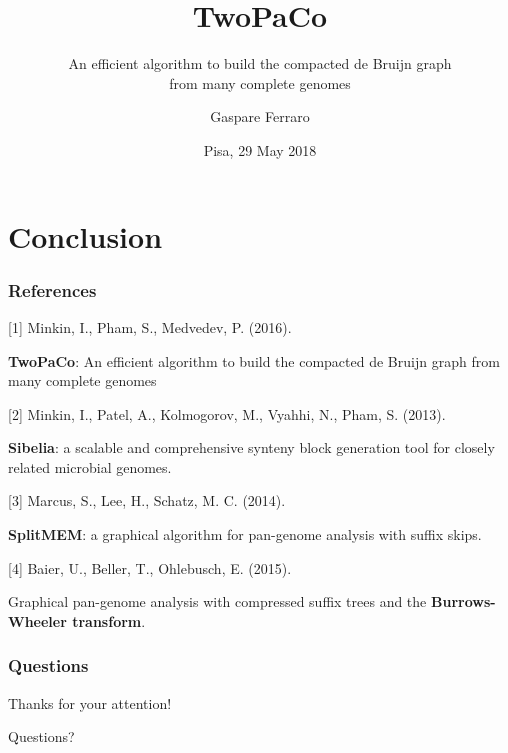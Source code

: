\documentclass[11pt,svgnames,smaller]{beamer}
\author{Gaspare Ferraro}
\institute[University of Pisa]{University of Pisa\\Department of Computer Science}
\title{TwoPaCo}
\subtitle{An efficient algorithm to build the compacted de Bruijn graph\\from many complete genomes}
\date{Pisa, 29 May 2018}
\begin{document}
	

	\begin{frame} 
	\titlepage
	\end{frame}
			
	
	
	
	
	\section{Conclusion}
	
	\begin{frame}
  \frametitle{References}
  
  [1] Minkin, I., Pham, S., Medvedev, P. (2016). 
  
  \textbf{TwoPaCo}: An efficient algorithm to build the compacted de Bruijn graph from many complete genomes	  

  \medskip
  
  [2] Minkin, I., Patel, A., Kolmogorov, M., Vyahhi, N., Pham, S. (2013). 
  
  \textbf{Sibelia}: a scalable and comprehensive synteny block generation tool for closely related microbial
genomes.

  \medskip
  
  [3] Marcus, S., Lee, H., Schatz, M. C. (2014). 
  
  \textbf{SplitMEM}: a graphical algorithm for pan-genome analysis with suffix skips.

  \medskip

  [4] Baier, U., Beller, T., Ohlebusch, E. (2015). 
  
  Graphical pan-genome analysis with compressed suffix trees and the \textbf{Burrows-Wheeler transform}.

	\end{frame}

	\begin{frame}
		\frametitle{Questions}
		\centering
		\Large
		Thanks for your attention!
		
		\bigskip
		
		Questions?
 	\end{frame}
 	
\end{document}
